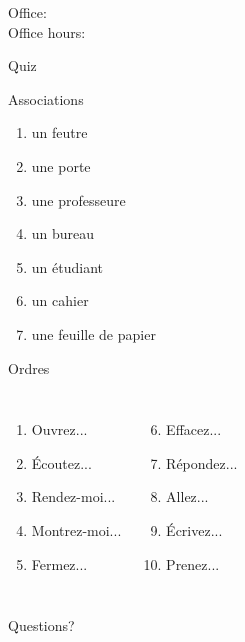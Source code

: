\documentclass{beamer}
\subtitle[À la fac]{À la fac}
\begin{document}
  \begin{frame}
    \titlepage
    \tiny{Office: \\
          Office hours: }
  \end{frame}

  \begin{frame}{}
    \begin{center}
      \Large Quiz
    \end{center}
  \end{frame}

  \begin{frame}{Associations }
    \begin{enumerate}
      \item un feutre
      \item une porte
      \item une professeure
      \item un bureau
      \item un étudiant
      \item un cahier
      \item une feuille de papier
    \end{enumerate}
  \end{frame}

  \begin{frame}{Ordres }
    \begin{columns}
        \begin{enumerate}
          \item Ouvrez...
          \item Écoutez...
          \item Rendez-moi...
          \item Montrez-moi...
          \item Fermez...
        \end{enumerate}
        \begin{enumerate}
          \setcounter{enumi}{5}
          \item Effacez...
          \item Répondez...
          \item Allez...
          \item Écrivez...
          \item Prenez...
        \end{enumerate}
    \end{columns}
  \end{frame}

  \begin{frame}{}
    \begin{center}
      \Large Questions?
    \end{center}
  \end{frame}
\end{document}
